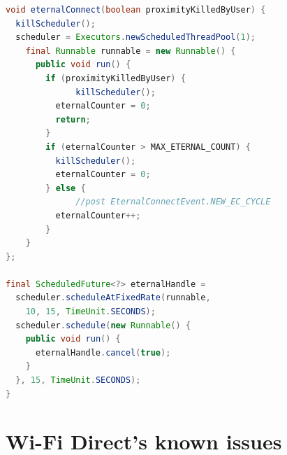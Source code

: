\begin{lstlisting}[caption={eternalConnect() method},label=eternalConnect, language=Java]
void eternalConnect(boolean proximityKilledByUser) {
  killScheduler();
  scheduler = Executors.newScheduledThreadPool(1);
    final Runnable runnable = new Runnable() {
      public void run() {
        if (proximityKilledByUser) {
        	  killScheduler();
          eternalCounter = 0;
          return;
        }	
		if (eternalCounter > MAX_ETERNAL_COUNT) {
          killScheduler();
          eternalCounter = 0;
        } else {
        	  //post EternalConnectEvent.NEW_EC_CYCLE
          eternalCounter++;
        }
	}
};

final ScheduledFuture<?> eternalHandle =
  scheduler.scheduleAtFixedRate(runnable, 
    10, 15, TimeUnit.SECONDS);
  scheduler.schedule(new Runnable() {
    public void run() {
      eternalHandle.cancel(true);
    }
  }, 15, TimeUnit.SECONDS);
}
\end{lstlisting}


\section{Wi-Fi Direct's known issues}

